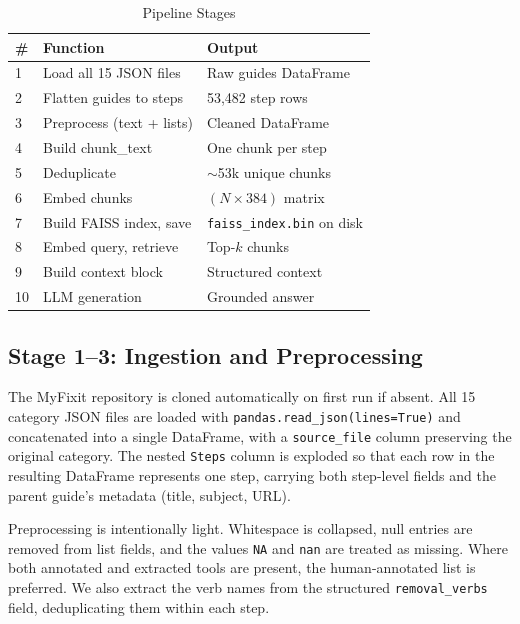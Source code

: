 \documentclass[journal,onecolumn]{IEEEtran}
\begin{document}
\begin{table}[h]
\centering
\caption{Pipeline Stages}
\label{tab:pipeline}
\begin{tabular}{p{}p{}p{}}
\toprule
\textbf{\#} & \textbf{Function} & \textbf{Output} \\
\midrule
1  & Load all 15 JSON files     & Raw guides DataFrame \\
2  & Flatten guides to steps    & 53,482 step rows \\
3  & Preprocess (text + lists)  & Cleaned DataFrame \\
4  & Build chunk\_text          & One chunk per step \\
5  & Deduplicate                & $\sim$53k unique chunks \\
6  & Embed chunks               & $(N \times 384)$ matrix \\
7  & Build FAISS index, save    & \texttt{faiss\_index.bin} on disk \\
8  & Embed query, retrieve      & Top-$k$ chunks \\
9  & Build context block        & Structured context \\
10 & LLM generation             & Grounded answer \\
\bottomrule
\end{tabular}
\end{table}

\subsection{Stage 1--3: Ingestion and Preprocessing}

The MyFixit repository is cloned automatically on first run if absent. All 15
category JSON files are loaded with \texttt{pandas.read\_json(lines=True)}
and concatenated into a single DataFrame, with a \texttt{source\_file} column
preserving the original category. The nested \texttt{Steps} column is exploded
so that each row in the resulting DataFrame represents one step, carrying
both step-level fields and the parent guide's metadata (title, subject, URL).

Preprocessing is intentionally light. Whitespace is collapsed, null entries
are removed from list fields, and the values \texttt{NA} and \texttt{nan} are
treated as missing. Where both annotated and extracted tools are present,
the human-annotated list is preferred. We also extract the verb names from
the structured \texttt{removal\_verbs} field, deduplicating them within each
step.
\end{document}
